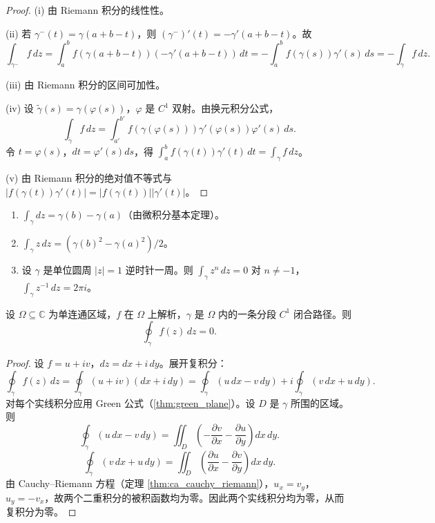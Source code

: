 \begin{proof}
(i) 由 Riemann 积分的线性性。

(ii) 若 $\gamma^- (t) = \gamma(a + b - t)$，则 $(\gamma^-)'(t) = -\gamma'(a + b - t)$。故
\[
\int_{\gamma^-} f \, dz = \int_a^b f(\gamma(a+b-t)) (-\gamma'(a+b-t)) \, dt = -\int_a^b f(\gamma(s)) \gamma'(s) \, ds = -\int_\gamma f \, dz.
\]

(iii) 由 Riemann 积分的区间可加性。

(iv) 设 $\tilde{\gamma}(s) = \gamma(\varphi(s))$，$\varphi$ 是 $C^1$ 双射。由换元积分公式，
\[
\int_{\tilde{\gamma}} f \, dz = \int_{a'}^{b'} f(\gamma(\varphi(s))) \gamma'(\varphi(s)) \varphi'(s) \, ds.
\]
令 $t = \varphi(s)$，$dt = \varphi'(s) ds$，得 $\int_a^b f(\gamma(t)) \gamma'(t) \, dt = \int_\gamma f \, dz$。

(v) 由 Riemann 积分的绝对值不等式与 $|f(\gamma(t)) \gamma'(t)| = |f(\gamma(t))| |\gamma'(t)|$。
\end{proof}

\begin{example}[基本复积分]\label{ex:ca_basic_integrals}
\begin{enumerate}[label=(\roman*)]
    \item $\int_\gamma dz = \gamma(b) - \gamma(a)$（由微积分基本定理）。
    \item $\int_\gamma z \, dz = (\gamma(b)^2 - \gamma(a)^2)/2$。
    \item 设 $\gamma$ 是单位圆周 $|z| = 1$ 逆时针一周。则 $\int_\gamma z^n \, dz = 0$ 对 $n \neq -1$，$\int_\gamma z^{-1} \, dz = 2\pi i$。
\end{enumerate}
\end{example}

\begin{theorem}\label{thm:ca_cauchy_integral}
设 $\Omega \subseteq \mathbb{C}$ 为单连通区域，$f$ 在 $\Omega$ 上解析，$\gamma$ 是 $\Omega$ 内的一条分段 $C^1$ 闭合路径。则
\[
\oint_\gamma f(z) \, dz = 0.
\]
\end{theorem}

\begin{proof}
设 $f = u + iv$，$dz = dx + i \, dy$。展开复积分：
\[
\oint_\gamma f(z) \, dz = \oint_\gamma (u + iv)(dx + i \, dy) = \oint_\gamma (u \, dx - v \, dy) + i \oint_\gamma (v \, dx + u \, dy).
\]
对每个实线积分应用 Green 公式（\cref{thm:green_plane}）。设 $D$ 是 $\gamma$ 所围的区域。则
\[
\oint_\gamma (u \, dx - v \, dy) = \iint_D \left( -\frac{\partial v}{\partial x} - \frac{\partial u}{\partial y} \right) dx \, dy.
\]
\[
\oint_\gamma (v \, dx + u \, dy) = \iint_D \left( \frac{\partial u}{\partial x} - \frac{\partial v}{\partial y} \right) dx \, dy.
\]
由 Cauchy--Riemann 方程（定理 \ref{thm:ca_cauchy_riemann}），$u_x = v_y$，$u_y = -v_x$，故两个二重积分的被积函数均为零。因此两个实线积分均为零，从而复积分为零。
\end{proof}

